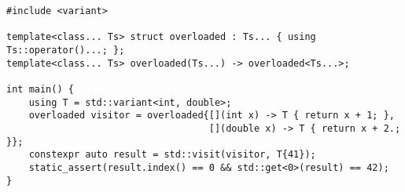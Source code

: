 \begin{lstlisting}[title=\href{https://godbolt.org/z/qawL8f}{\texttt{godbolt.org/z/qawL8f}}]
#include <variant>

template<class... Ts> struct overloaded : Ts... { using Ts::operator()...; };
template<class... Ts> overloaded(Ts...) -> overloaded<Ts...>;

int main() {
    using T = std::variant<int, double>;
    overloaded visitor = overloaded{[](int x) -> T { return x + 1; },
                                    [](double x) -> T { return x + 2.; }};
    constexpr auto result = std::visit(visitor, T{41});
    static_assert(result.index() == 0 && std::get<0>(result) == 42);
}
\end{lstlisting}
